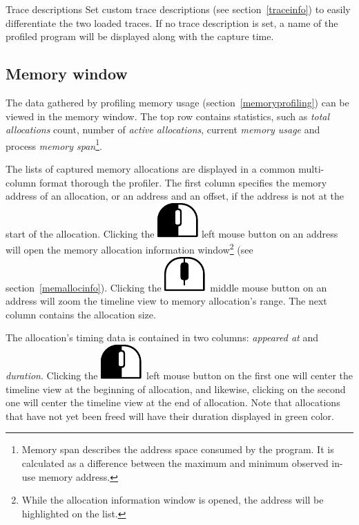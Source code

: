 \documentclass[hidelinks,titlepage,a4paper]{article}
\newcommand{\LMB}{\includegraphics[height=.8\baselineskip]{icons/lmb}}
\newcommand{\MMB}{\includegraphics[height=.8\baselineskip]{icons/mmb}}
\begin{document}
\begin{bclogo}[
noborder=true,
couleur=black!5,
logo=\bclampe
]{Trace descriptions}
Set custom trace descriptions (see section~\ref{traceinfo}) to easily differentiate the two loaded traces. If no trace description is set, a name of the profiled program will be displayed along with the capture time.
\end{bclogo}

\subsection{Memory window}
\label{memorywindow}

The data gathered by profiling memory usage (section~\ref{memoryprofiling}) can be viewed in the memory window. The top row contains statistics, such as \emph{total allocations} count, number of \emph{active allocations}, current \emph{memory usage} and process \emph{memory span}\footnote{Memory span describes the address space consumed by the program. It is calculated as a difference between the maximum and minimum observed in-use memory address.}.

The lists of captured memory allocations are displayed in a common multi-column format thorough the profiler. The first column specifies the memory address of an allocation, or an address and an offset, if the address is not at the start of the allocation. Clicking the \LMB{} left mouse button on an address will open the memory allocation information window\footnote{While the allocation information window is opened, the address will be highlighted on the list.} (see section~\ref{memallocinfo}). Clicking the \MMB{}~middle mouse button on an address will zoom the timeline view to memory allocation's range. The next column contains the allocation size.

The allocation's timing data is contained in two columns: \emph{appeared at} and \emph{duration}. Clicking the \LMB{}~left mouse button on the first one will center the timeline view at the beginning of allocation, and likewise, clicking on the second one will center the timeline view at the end of allocation. Note that allocations that have not yet been freed will have their duration displayed in green color.
\end{document}

